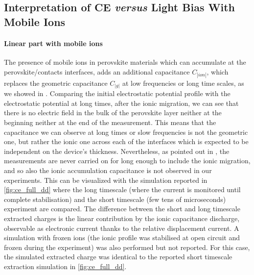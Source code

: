 	\subsection{Interpretation of CE \textsl{versus} Light Bias With Mobile Ions}

		\paragraph{Linear part with mobile ions}\label{ce_ions_linear}
		The presence of mobile ions in perovskite materials which can accumulate at the perovskite/contacts interfaces, adds an additional capacitance $C_|ion|$, which replaces the geometric capacitance $C_|g|$ at low frequencies or long time scales, as we showed in .
		Comparing the initial electrostatic potential profile with the electrostatic potential at long times, after the ionic migration, we can see that there is no electric field in the bulk of the perovskite layer neither at the beginning neither at the end of the measurement.
		This means that the capacitance we can observe at long times or slow frequencies is not the geometric one, but rather the ionic one across each of the interfaces which is expected to be independent on the device's thickness.
		Nevertheless, as pointed out in , the  measurements are never carried on for long enough to include the ionic migration, and so also the ionic accumulation capacitance is not observed in our experiments.
		This can be visualized with the simulation reported in \cref{fig:ce_full_dd} where the long timescale (where the current is monitored until complete stabilisation) and the short timescale (few tens of microseconds)  experiment are compared.
		The difference between the short and long timescale extracted charges is the linear contribution by the ionic capacitance discharge, observable as electronic current thanks to the relative displacement current.
		A simulation with frozen ions (the ionic profile was stabilised at open circuit and frozen during the  experiment) was also performed but not reported.
		For this case, the simulated extracted charge was identical to the reported short timescale extraction simulation in \cref{fig:ce_full_dd}.

